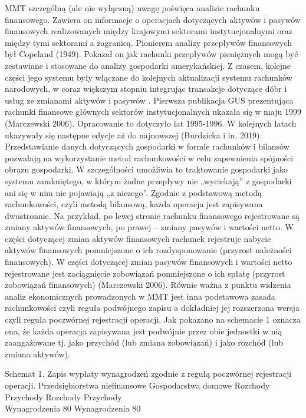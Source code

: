 \documentclass[
]{book}
\begin{document}
MMT szczególną (ale nie wyłączną) uwagę poświęca analizie rachunku finansowego. Zawiera on informacje o operacjach dotyczących aktywów i pasywów finansowych realizowanych między krajowymi sektorami instytucjonalnymi oraz między tymi sektorami a zagranicą.
Pionierem analizy przepływów finansowych był Copeland (1949). Pokazał on jak rachunki przepływów pieniężnych mogą być zestawiane i stosowane do analizy gospodarki amerykańskiej. Z czasem, kolejne części jego systemu były włączane do kolejnych aktualizacji systemu rachunków narodowych, w coraz większym stopniu integrując transakcje dotyczące dóbr i usług ze zmianami aktywów i pasywów .
Pierwsza publikacja GUS prezentująca rachunki finansowe głównych sektorów instytucjonalnych ukazała się w maju 1999 (Marczewski 2006). Opracowanie to dotyczyło lat 1995-1996. W kolejnych latach ukazywały się następne edycje aż do najnowszej (Burdzicka i in. 2019).
Przedstawianie danych dotyczących gospodarki w formie rachunków i bilansów pozwalają na wykorzystanie metod rachunkowości w celu zapewnienia spójności obrazu gospodarki. W szczególności umożliwia to traktowanie gospodarki jako systemu zamkniętego, w którym żadne przepływy nie „wyciekają'' z gospodarki ani się w nim nie pojawiają „z niczego''.
Zgodnie z podstawową metodą rachunkowości, czyli metodą bilansową, każda operacja jest zapisywana dwustronnie. Na przykład, po lewej stronie rachunku finansowego rejestrowane są zmiany aktywów finansowych, po prawej -- zmiany pasywów i wartości netto. W części dotyczącej zmian aktywów finansowych rachunek rejestruje nabycie aktywów finansowych pomniejszone o ich rozdysponowanie (przyrost należności finansowych). W części dotyczącej zmian pasywów finansowych i wartości netto rejestrowane jest zaciągnięcie zobowiązań pomniejszone o ich spłatę (przyrost zobowiązań finansowych) (Marczewski 2006).
Równie ważna z punktu widzenia analiz ekonomicznych prowadzonych w MMT jest inna podstawowa zasada rachunkowości czyli reguła podwójnego zapisu a dokładniej jej rozszerzona wersja czyli reguła poczwórnej rejestracji operacji. Jak pokazano na schemacie 1 oznacza ona, że każda operacja zapisywana jest podwójnie przez obie jednostki w nią zaangażowane tj. jako przychód (lub zmiana zobowiązań) i jako rozchód (lub zmiana aktywów).

Schemat 1. Zapis wypłaty wynagrodzeń zgodnie z regułą poczwórnej rejestracji operacji.
Przedsiębiorstwa niefinansowe Gospodarstwa domowe
Rozchody Przychody Rozchody Przychody\\
Wynagrodzenia 80 Wynagrodzenia 80
\end{document}
